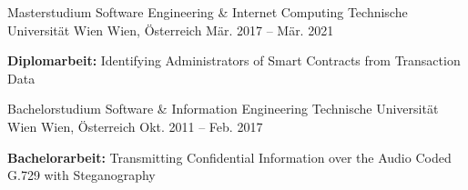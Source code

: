 


\begin{cventries}


\cventry
{Masterstudium Software Engineering \& Internet Computing} %
{Technische Universität Wien} %
{Wien, Österreich} %
{Mär. 2017 -- Mär. 2021} %
{ %
\begin{cvitems}
\item {\textbf{Diplomarbeit: } Identifying Administrators of Smart Contracts from Transaction Data}
\end{cvitems}
}


\cventry
{Bachelorstudium Software \& Information Engineering} %
{Technische Universität Wien} %
{Wien, Österreich} %
{Okt. 2011 -- Feb. 2017} %
{ %
\begin{cvitems}
\item {\textbf{Bachelorarbeit: } Transmitting Confidential Information over the Audio Coded G.729 with Steganography}
\end{cvitems}
}


\end{cventries}